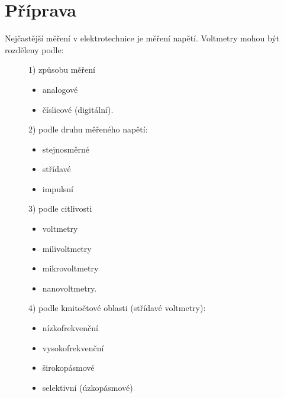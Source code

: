 \documentclass{article}
\begin{document}
\section*{Příprava}
Nejčastější měření v elektrotechnice je měření napětí.
Voltmetry mohou být rozděleny podle:

\begin{figure}[H]
    \scriptsize
    {
        \begin{minipage}[t]{0.24\textwidth}
            1) způsobu měření
            \begin{itemize}
                \item analogové
                \item číslicové (digitální).
            \end{itemize}
        \end{minipage}
        \hfill
        \begin{minipage}[t]{0.24\textwidth}
            2) podle druhu měřeného napětí:
            \begin{itemize}
                \item stejnosměrné
                \item střídavé
                \item impulsní
            \end{itemize}
        \end{minipage}
        \hfill
        \begin{minipage}[t]{0.24\textwidth}
            3) podle citlivosti
            \begin{itemize}
                \item voltmetry
                \item milivoltmetry
                \item mikrovoltmetry
                \item nanovoltmetry.
            \end{itemize}
        \end{minipage}
        \hfill
        \begin{minipage}[t]{0.24\textwidth}
            4) podle kmitočtové oblasti (střídavé voltmetry):
            \begin{itemize}
                \item nízkofrekvenční
                \item vysokofrekvenční
                \item širokopásmové
                \item selektivní (úzkopásmové)
            \end{itemize}
        \end{minipage}
    }
\end{figure}
\end{document}
